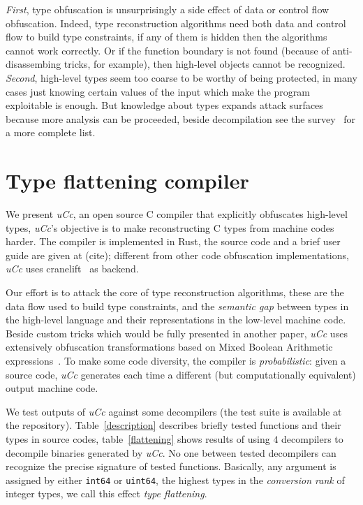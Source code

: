\documentclass[a4paper]{llncs}
\begin{document}
\emph{First}, type obfuscation is unsurprisingly a side effect of data or control flow obfuscation.
Indeed, type reconstruction algorithms need both data and control flow to build type constraints,
if any of them is hidden
then the algorithms cannot work correctly. Or if the function boundary is not found
(because of anti-disassembing tricks, for example), then high-level objects cannot be recognized.
\emph{Second}, high-level types seem too coarse to be worthy
of being protected, in many cases just knowing certain values of the input which make the program
exploitable is enough. But knowledge about types expands attack surfaces because more analysis
can be proceeded, beside decompilation see the survey~\cite{caballero_type_2016} for a
more complete list.


\section{Type flattening compiler}
We present \emph{uCc}, an open source C compiler that explicitly obfuscates high-level types, \emph{uCc}'s
objective is to make reconstructing C types from machine codes harder.
The compiler is implemented in Rust, the source code and a brief user guide are given at (cite); different
from other code obfuscation implementations, \emph{uCc} uses cranelift~\cite{noauthor_cranelift_nodate} as
backend.

Our effort is to attack the core of type reconstruction algorithms,
these are the data flow used to build type constraints, and the \emph{semantic gap} between types in the high-level language and their
representations in the low-level machine code.
Beside custom tricks which would be fully presented in another paper, \emph{uCc} uses extensively
obfuscation transformations based on Mixed Boolean Arithmetic expressions~\cite{eyrolles_obfuscation_2017,zhou_information_2007}.
To make some code diversity, the compiler is \emph{probabilistic}: given a source
code, \emph{uCc} generates each time a different (but computationally equivalent) output machine code.

We test outputs of \emph{uCc} against some decompilers (the test suite is available at
the repository). Table~\ref{description} describes briefly
tested functions and their types in source codes, table~\ref{flattening} shows results of using
$4$ decompilers to decompile binaries generated by \emph{uCc}.
No one between tested decompilers can recognize the precise signature of tested functions.
Basically, any argument is assigned by either \texttt{int64} or \texttt{uint64},
the highest types in the \emph{conversion rank} of integer types, we call this effect \emph{type flattening}.
\end{document}
